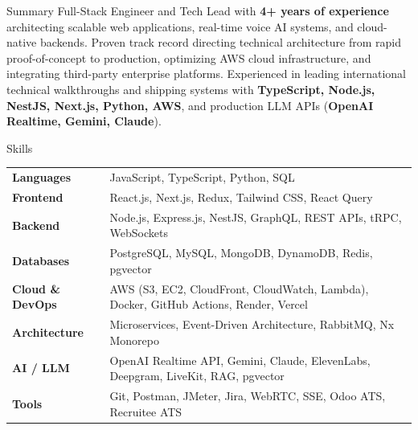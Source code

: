 \documentclass[10pt]{resume}
\begin{document}
\begin{rSection}{Summary}
Full-Stack Engineer and Tech Lead with \textbf{4+ years of experience} architecting scalable web applications, real-time voice AI systems, and cloud-native backends. Proven track record directing technical architecture from rapid proof-of-concept to production, optimizing AWS cloud infrastructure, and integrating third-party enterprise platforms. Experienced in leading international technical walkthroughs and shipping systems with \textbf{TypeScript, Node.js, NestJS, Next.js, Python, AWS}, and production LLM APIs (\textbf{OpenAI Realtime, Gemini, Claude}).
\end{rSection}
\vspace{-0.55em}

\begin{rSection}{Skills}
\begin{tabular}{@{} >{\bfseries}l @{\hspace{3.5ex}} l }
Languages        & JavaScript, TypeScript, Python, SQL \\[0.1ex]
Frontend         & React.js, Next.js, Redux, Tailwind CSS, React Query \\[0.1ex]
Backend          & Node.js, Express.js, NestJS, GraphQL, REST APIs, tRPC, WebSockets \\[0.1ex]
Databases        & PostgreSQL, MySQL, MongoDB, DynamoDB, Redis, pgvector \\[0.1ex]
Cloud \& DevOps  & AWS (S3, EC2, CloudFront, CloudWatch, Lambda), Docker, GitHub Actions, Render, Vercel \\[0.1ex]
Architecture     & Microservices, Event-Driven Architecture, RabbitMQ, Nx Monorepo \\[0.1ex]
AI / LLM         & OpenAI Realtime API, Gemini, Claude, ElevenLabs, Deepgram, LiveKit, RAG, pgvector \\[0.1ex]
Tools            & Git, Postman, JMeter, Jira, WebRTC, SSE, Odoo ATS, Recruitee ATS
\end{tabular}
\end{rSection}
\vspace{-0.55em}
\end{document}
